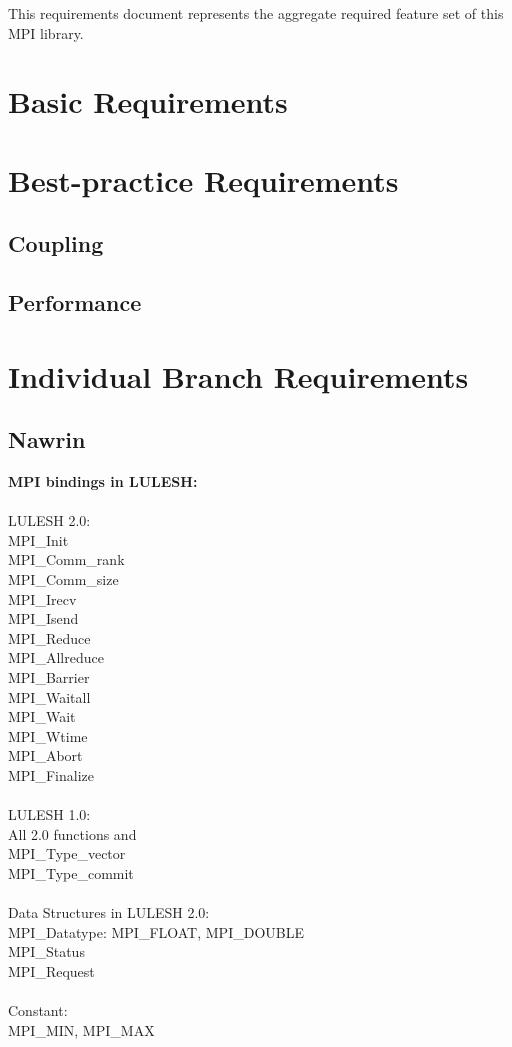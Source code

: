 \documentclass{article}
\begin{document}
This requirements document represents the aggregate required feature set of this MPI library.

\section{Basic Requirements}

\section{Best-practice Requirements}

\subsection{Coupling}

\subsection{Performance}

\section{Individual Branch Requirements}

\subsection{Nawrin}
\textbf{MPI bindings in LULESH:}\\\\
LULESH 2.0:\\
MPI\_Init\\
MPI\_Comm\_rank\\
MPI\_Comm\_size\\
MPI\_Irecv\\
MPI\_Isend\\
MPI\_Reduce\\
MPI\_Allreduce\\
MPI\_Barrier\\
MPI\_Waitall\\
MPI\_Wait\\
MPI\_Wtime\\
MPI\_Abort\\
MPI\_Finalize\\
\\
LULESH 1.0:\\
All 2.0 functions and \\
MPI\_Type\_vector\\
MPI\_Type\_commit\\
\\
Data Structures in LULESH 2.0:\\
MPI_Datatype: MPI_FLOAT, MPI_DOUBLE\\
MPI_Status\\
MPI_Request\\
\\
Constant:\\
MPI_MIN, MPI_MAX\\
\\
\end{document}
